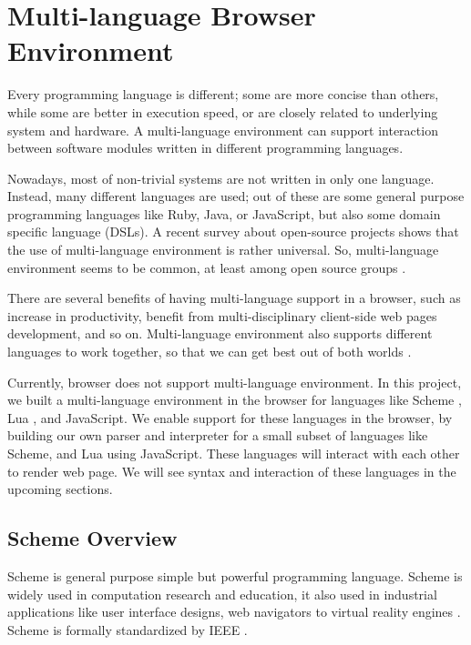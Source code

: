 \section{Multi-language Browser Environment} 

Every programming language is different; some are more concise than others, while some are better in execution speed, or are closely related to underlying system and hardware. A multi-language environment can support interaction between software modules written in different programming languages.

Nowadays, most of non-trivial systems are not written in only one language.
Instead, many different languages are used; out of these are some general purpose programming languages like Ruby, Java, or JavaScript, but also some domain specific language (DSLs). A recent survey about open-source projects shows that the use of multi-language environment is rather universal. So, multi-language environment seems to be common, at least among open source groups \cite{Mayer2017}.

There are several benefits of having multi-language support in a browser, such as increase in productivity, benefit from multi-disciplinary client-side web pages development, and so on. Multi-language environment also supports different languages to work together, so that we can get best out of both worlds \cite{Matthews:2007:OSM:1190216.1190220}.


Currently, browser does not support multi-language environment. In this project, we built a multi-language environment in the browser for languages like Scheme \cite{Dybvig:2009:SPL:1618542}, Lua \cite{Ierusalimschy:2006:LRM:1215067}, and JavaScript. We enable support for these languages in the browser, by building our own parser and interpreter for a small subset of languages like Scheme, and Lua using JavaScript. These languages will interact with each other to render web page. We will see syntax and interaction of these languages in the upcoming sections. 


\subsection{Scheme Overview}

Scheme \cite{Dybvig:2009:SPL:1618542} is general purpose simple but powerful programming language.
 Scheme is widely used in computation research and education, it also used in industrial applications like user interface designs, web navigators to virtual reality engines \cite{Dybvig:1996:SPL:525334}. Scheme is formally standardized by IEEE \cite{schemeieee}.

